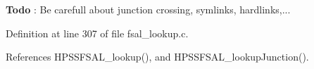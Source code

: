 \begin{Desc}
\item[{\bf Todo}]: Be carefull about junction crossing, symlinks, hardlinks,... \end{Desc}


Definition at line 307 of file fsal\_\-lookup.c.

References HPSSFSAL\_\-lookup(), and HPSSFSAL\_\-lookupJunction().